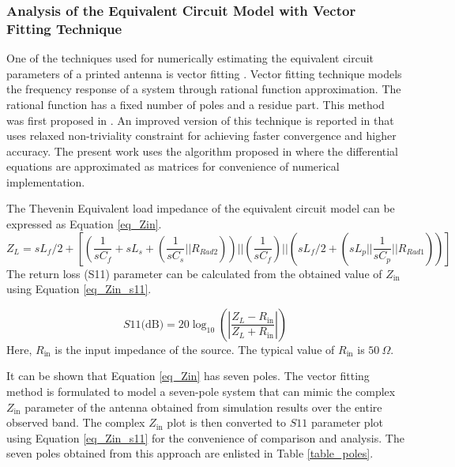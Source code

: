 \subsubsection{Analysis of the Equivalent Circuit Model with Vector Fitting Technique}
One of the techniques used for numerically estimating the equivalent circuit parameters of a printed antenna is vector fitting \cite{vectorfitting1, vectorfitting2, vectorfitting3}. Vector fitting technique models the frequency response of a system through rational function approximation. The rational function has a fixed number of poles and a residue part. This method was first proposed in \cite{vfit3_1}. An improved version of this technique is reported in \cite{vfit3_2} that uses relaxed non-triviality constraint for achieving faster convergence and higher accuracy. The present work uses the algorithm proposed in \cite{vfit3_3} where the differential equations are approximated as matrices for convenience of numerical implementation.

The Thevenin Equivalent load impedance of the equivalent circuit model can be expressed as Equation \ref{eq_Zin}.
{\small
\begin{equation}\label{eq_Zin}
Z_{L} = sL_f/2 + \left[\left(\frac{1}{sC_f}+sL_s+\left(\frac{1}{sC_s} || R_{Rad2}\right)\right) || \left(\frac{1}{sC_f}\right) || \left(sL_f/2 + \left(sL_p || \frac{1}{sC_p} || R_{Rad1}\right)\right)\right]
\end{equation}}
The return loss (S11) parameter can be calculated from the obtained value of $Z_{\text{in}}$ using Equation \ref{eq_Zin_s11}.

\begin{equation}\label{eq_Zin_s11}
S11\text{(dB)}=20 \log_{10}{\left(\left|\frac{Z_L - R_{\text{in}}}{Z_L + R_{\text{in}}}\right|\right)}
\end{equation}
Here, $R_{\text{in}}$ is the input impedance of the source. The typical value of $R_{\text{in}}$ is $50~\Omega$.

It can be shown that Equation \ref{eq_Zin} has seven poles. The vector fitting method is formulated to model a seven-pole system that can mimic the complex $Z_{\text{in}}$ parameter of the antenna obtained from simulation results over the entire observed band. The complex $Z_{\text{in}}$ plot is then converted to $S11$ parameter plot using Equation \ref{eq_Zin_s11} for the convenience of comparison and analysis. The seven poles obtained from this approach are enlisted in Table \ref{table_poles}.

